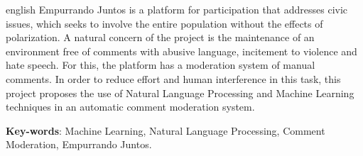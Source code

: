 \begin{resumo}[Abstract]
 \begin{otherlanguage*}{english}
Empurrando Juntos is a platform for participation that addresses civic issues, which seeks to involve the entire population without the effects of polarization. A natural concern of the project is the maintenance of an environment free of comments with abusive language, incitement to violence and hate speech. For this, the platform has a moderation system of manual comments. In order to reduce effort and human interference in this task, this project proposes the use of Natural Language Processing and Machine Learning techniques in an automatic comment moderation system.

   \vspace{\onelineskip}
 
   \noindent 
   \textbf{Key-words}: Machine Learning, Natural Language Processing, Comment Moderation, Empurrando Juntos.
 \end{otherlanguage*}
\end{resumo}